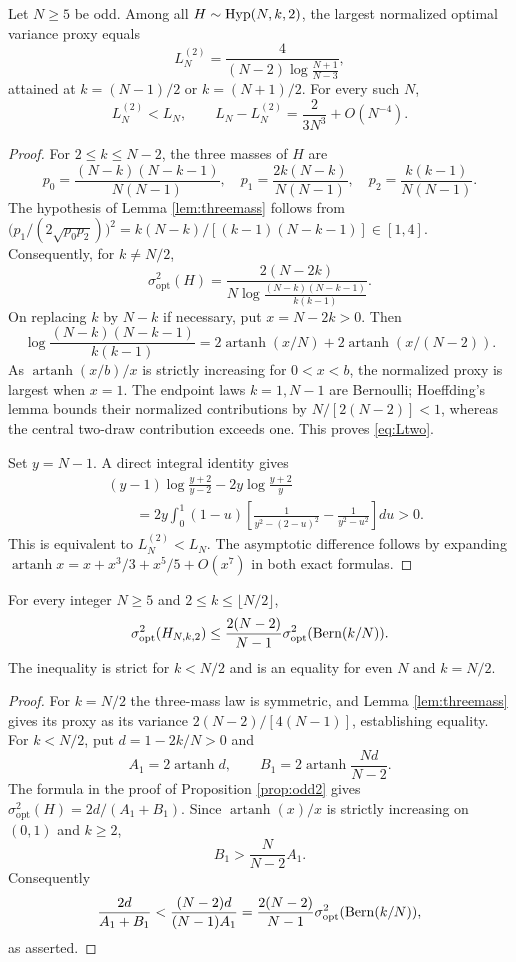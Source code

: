 \begin{proposition}\label{prop:odd2}
Let $N\ge5$ be odd. Among all $H\sim\operatorname{Hyp}(N,k,2)$, the largest normalized optimal variance proxy equals
\begin{equation}\label{eq:Ltwo}
 L_N^{(2)}=\frac{4}{(N-2)\log\frac{N+1}{N-3}},
\end{equation}
attained at $k=(N-1)/2$ or $k=(N+1)/2$. For every such $N$,
\begin{equation}\label{eq:twostrict}
 L_N^{(2)}<L_N,
 \qquad L_N-L_N^{(2)}=\frac{2}{3N^3}+O(N^{-4}).
\end{equation}
\end{proposition}
\begin{proof}
For $2\le k\le N-2$, the three masses of $H$ are
\[
 p_0=\frac{(N-k)(N-k-1)}{N(N-1)},\quad
 p_1=\frac{2k(N-k)}{N(N-1)},\quad
 p_2=\frac{k(k-1)}{N(N-1)}.
\]
The hypothesis of Lemma \ref{lem:threemass} follows from
$\bigl(p_1/(2\sqrt{p_0p_2})\bigr)^2=k(N-k)/[(k-1)(N-k-1)]\in[1,4]$.
Consequently, for $k\ne N/2$,
\[
 \sigma^2_{\mathrm{opt}}(H)
 =\frac{2(N-2k)}{N\log\frac{(N-k)(N-k-1)}{k(k-1)}}.
\]
On replacing $k$ by $N-k$ if necessary, put $x=N-2k>0$. Then
\[
 \log\frac{(N-k)(N-k-1)}{k(k-1)}
 =2\operatorname{artanh}(x/N)+2\operatorname{artanh}(x/(N-2)).
\]
As $\operatorname{artanh}(x/b)/x$ is strictly increasing for $0<x<b$, the normalized proxy is largest when $x=1$. The endpoint laws $k=1,N-1$ are Bernoulli; Hoeffding's lemma bounds their normalized contributions by $N/[2(N-2)]<1$, whereas the central two-draw contribution exceeds one. This proves \eqref{eq:Ltwo}.

Set $y=N-1$. A direct integral identity gives
\begin{align*}
 &(y-1)\log\frac{y+2}{y-2}-2y\log\frac{y+2}{y}\\
 &\qquad=2y\int_0^1(1-u)
 \left[\frac1{y^2-(2-u)^2}-\frac1{y^2-u^2}\right]du>0.
\end{align*}
This is equivalent to $L_N^{(2)}<L_N$. The asymptotic difference follows by expanding $\operatorname{artanh}x=x+x^3/3+x^5/5+O(x^7)$ in both exact formulas.
\end{proof}

\begin{corollary}\label{cor:two_bern_envelope}
For every integer $N\ge5$ and $2\le k\le\lfloor N/2\rfloor$,
\[
 \sigma^2_{\mathrm{opt}}(H_{N,k,2})
 \le\frac{2(N-2)}{N-1}\sigma^2_{\mathrm{opt}}(\operatorname{Bern}(k/N)).
\]
The inequality is strict for $k<N/2$ and is an equality for even $N$ and $k=N/2$.
\end{corollary}
\begin{proof}
For $k=N/2$ the three-mass law is symmetric, and Lemma \ref{lem:threemass} gives its proxy as its variance $2(N-2)/[4(N-1)]$, establishing equality. For $k<N/2$, put $d=1-2k/N>0$ and
\[
 A_1=2\operatorname{artanh}d,\qquad
 B_1=2\operatorname{artanh}\frac{Nd}{N-2}.
\]
The formula in the proof of Proposition \ref{prop:odd2} gives
$\sigma^2_{\mathrm{opt}}(H)=2d/(A_1+B_1)$. Since $\operatorname{artanh}(x)/x$ is strictly increasing on $(0,1)$ and $k\ge2$,
\[
 B_1>\frac{N}{N-2}A_1.
\]
Consequently
\[
 \frac{2d}{A_1+B_1}<\frac{(N-2)d}{(N-1)A_1}
 =\frac{2(N-2)}{N-1}\sigma^2_{\mathrm{opt}}(\operatorname{Bern}(k/N)),
\]
as asserted.
\end{proof}
